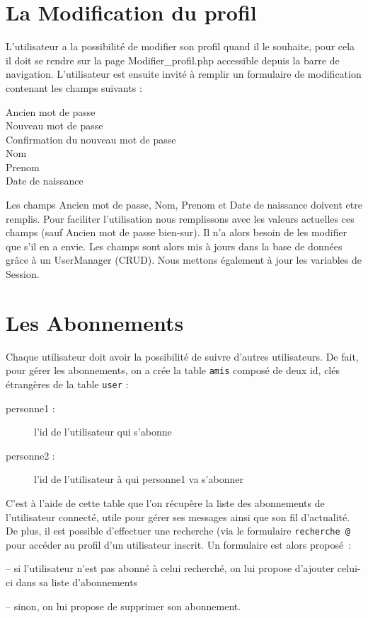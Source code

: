 \documentclass[a4paper, 12pt]{article}
\begin{document}
\section{La Modification du profil}
L'utilisateur a la possibilité de modifier son profil quand il le souhaite, pour cela il doit se rendre sur la page Modifier\_profil.php accessible depuis la barre de navigation.
L'utilisateur est ensuite invité à remplir un formulaire de modification contenant les champs suivants :
\begin{description}
\item[Ancien mot de passe]
\item[Nouveau mot de passe]
\item[Confirmation du nouveau mot de passe]
\item[Nom]
\item[Prenom]
\item[Date de naissance]
\end{description}
Les champs Ancien mot de passe, Nom, Prenom et Date de naissance doivent etre remplis. Pour faciliter l'utilisation nous remplissons avec les valeurs actuelles ces champs (sauf Ancien mot de passe bien-sur).
Il n'a alors besoin de les modifier que s'il en a envie. Les champs sont alors mis à jours dans la base de données grâce à un UserManager (CRUD). Nous mettons également à jour les variables de Session.



\section{Les Abonnements}	

Chaque utilisateur doit avoir la possibilité de suivre d'autres utilisateurs. De fait, pour gérer les abonnements, on a crée la table \texttt{amis} composé de deux id, clés étrangères de la table \texttt{user} :
\begin{description}
\item[personne1 :] l’id de l’utilisateur qui s’abonne
\item[personne2 :] l’id de l’utilisateur à qui personne1 va s’abonner
\end{description}
C’est à l’aide de cette table que l’on récupère la liste des abonnements de l’utilisateur connecté, utile pour gérer ses messages ainsi que son fil d’actualité.
De plus, il est possible d’effectuer une recherche (via le formulaire \texttt{recherche @} pour accéder au profil d’un utilisateur inscrit. Un formulaire est alors proposé :
\begin{description}
\item  -- si l’utilisateur n’est pas abonné à celui recherché, on lui propose d’ajouter celui-ci dans sa liste d’abonnements
\item -- sinon, on lui propose de supprimer son abonnement.
\end{description}
\end{document}
